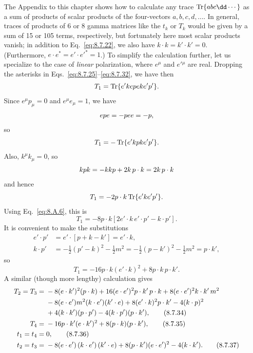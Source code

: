 The Appendix to this chapter shows how to calculate any trace
$\operatorname{Tr}\{\sl{a}\sl{b}\sl{c}\sl{\dd}\cdots\}$ as a sum of products
of scalar products of the four-vectors $a,b,c,d,\ldots$. In general, traces
of products of 6 or 8 gamma matrices like the $t_k$ or $T_k$ would be given by
a sum of 15 or 105 terms, respectively, but fortunately here most scalar
products vanish; in addition to Eq.~\eqref{eq:8.7.22}, we also have
$k\cdot k=k'\cdot k'=0$. (Furthermore,
$e\cdot e^*=e'\cdot e'^*=1$.) To simplify the calculation further, let us
specialize to the case of \emph{linear} polarization, where $e^\mu$ and
$e'{}^\mu$ are real. Dropping the asterisks in Eqs.~\eqref{eq:8.7.25}--\eqref{eq:8.7.32}, we
have then
\[
T_1=\operatorname{Tr}\{\sl{e'}\sl{k}\sl{e}\sl{p}\sl{e}\sl{k}\sl{e'}\sl{p'}\}.
\]
Since $e^\mu p_\mu=0$ and $e^\mu e_\mu=1$, we have
\[
\sl{e}\sl{p}\sl{e}=-\sl{p}\sl{e}\sl{e}=-\sl{p},
\]
so
\[
T_1=-\operatorname{Tr}\{\sl{e'}\sl{k}\sl{p}\sl{k}\sl{e'}\sl{p'}\}.
\]
Also, $k^\mu k_\mu=0$, so
\[
\sl{k}\sl{p}\sl{k}=-\sl{k}\sl{k}\sl{p}+2\sl{k}\,p\cdot k
=2\sl{k}\,p\cdot k
\]
and hence
\[
T_1=-2p\cdot k\operatorname{Tr}\{\sl{e'}\sl{k}\sl{e'}\sl{p'}\}.
\]
Using Eq.~\eqref{eq:8.A.6}, this is
\[
T_1=-8p\cdot k[2e'\cdot k\,e'\cdot p'-k\cdot p'].
\]
It is convenient to make the substitutions
\begin{align*}
e'\cdot p'&=e'\cdot[p+k-k']=e'\cdot k,\\
k\cdot p'&=-\tfrac12(p'-k)^2-\tfrac12m^2
=-\tfrac12(p-k')^2-\tfrac12m^2=p\cdot k',
\end{align*}
so
\begin{equation}
T_1=-16p\cdot k(e'\cdot k)^2+8p\cdot k\,p\cdot k'.
\tag{8.7.33}\label{eq:8.7.33}
\end{equation}
A similar (though more lengthy) calculation gives
\begin{align}
T_2=T_3={}&-8(e\cdot k')^2(p\cdot k)
+16(e\cdot e')^2p\cdot k'\,p\cdot k
+8(e\cdot e')^2k\cdot k'\,m^2
\notag\\
&-8(e\cdot e')m^2(k\cdot e')(k'\cdot e)
+8(e'\cdot k)^2p\cdot k'
-4(k\cdot p)^2
\notag\\
&+4(k\cdot k')(p\cdot p')-4(k\cdot p')(p\cdot k'),
\tag{8.7.34}\label{eq:8.7.34}\\
T_4={}&-16p\cdot k'(e\cdot k')^2+8(p\cdot k)(p\cdot k'),
\tag{8.7.35}\label{eq:8.7.35}\\
t_1=t_4={}&0,
\tag{8.7.36}\label{eq:8.7.36}\\
t_2=t_3={}&-8(e\cdot e')\,(k\cdot e')\,(k'\cdot e)
+8(p\cdot k')(e\cdot e')^2-4(k\cdot k').
\tag{8.7.37}\label{eq:8.7.37}
\end{align}
